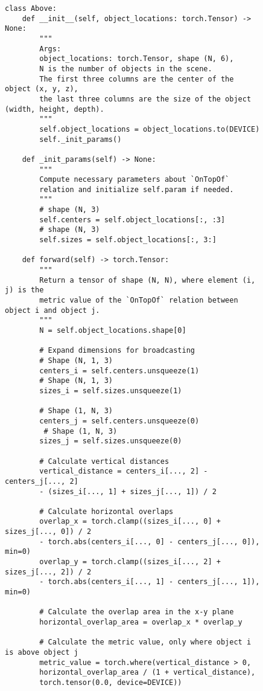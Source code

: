 \begin{figure*}[htbp]
    \centering
    \begin{subfigure}{0.45\textwidth} 
       \begin{lstlisting}[style=pythonstyle]
class Above:
    def __init__(self, object_locations: torch.Tensor) -> None:
        """
        Args:
        object_locations: torch.Tensor, shape (N, 6), 
        N is the number of objects in the scene.
        The first three columns are the center of the object (x, y, z),
        the last three columns are the size of the object (width, height, depth).
        """
        self.object_locations = object_locations.to(DEVICE)
        self._init_params()
    
    def _init_params(self) -> None:
        """
        Compute necessary parameters about `OnTopOf` 
        relation and initialize self.param if needed.
        """
        # shape (N, 3)
        self.centers = self.object_locations[:, :3] 
        # shape (N, 3)
        self.sizes = self.object_locations[:, 3:]   
    
    def forward(self) -> torch.Tensor:
        """
        Return a tensor of shape (N, N), where element (i, j) is the 
        metric value of the `OnTopOf` relation between object i and object j.
        """
        N = self.object_locations.shape[0]
        
        # Expand dimensions for broadcasting
        # Shape (N, 1, 3)
        centers_i = self.centers.unsqueeze(1)  
        # Shape (N, 1, 3)
        sizes_i = self.sizes.unsqueeze(1)  
        
        # Shape (1, N, 3)
        centers_j = self.centers.unsqueeze(0)
         # Shape (1, N, 3)
        sizes_j = self.sizes.unsqueeze(0)     

        # Calculate vertical distances
        vertical_distance = centers_i[..., 2] - centers_j[..., 2]
        - (sizes_i[..., 1] + sizes_j[..., 1]) / 2

        # Calculate horizontal overlaps
        overlap_x = torch.clamp((sizes_i[..., 0] + sizes_j[..., 0]) / 2 
        - torch.abs(centers_i[..., 0] - centers_j[..., 0]), min=0)
        overlap_y = torch.clamp((sizes_i[..., 2] + sizes_j[..., 2]) / 2 
        - torch.abs(centers_i[..., 1] - centers_j[..., 1]), min=0)

        # Calculate the overlap area in the x-y plane
        horizontal_overlap_area = overlap_x * overlap_y

        # Calculate the metric value, only where object i is above object j
        metric_value = torch.where(vertical_distance > 0,
        horizontal_overlap_area / (1 + vertical_distance), 
        torch.tensor(0.0, device=DEVICE))


\end{lstlisting}
\end{subfigure}
\end{figure*}
